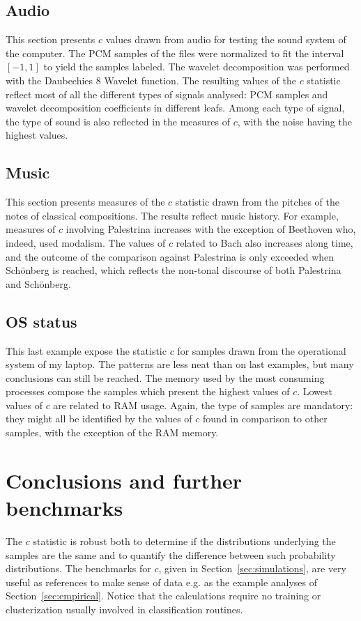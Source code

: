 \documentclass[%
	aip,
	jmp,%
	amsmath,amssymb,
	reprint,%
]{revtex4-1}
\begin{document}
\FloatBarrier
\subsection{Audio}
This section presents $c$ values
drawn from audio for testing the sound system of the computer.
The PCM samples of the files were normalized to fit the interval
$[-1,1]$ to yield the samples labeled. The wavelet decomposition was performed with the Daubechies 8 Wavelet function.
The resulting values of the $c$ statistic reflect most of all the
different types of signals analysed:
PCM samples and wavelet decomposition coefficients in different leafs.
Among each type of signal, the type of sound is also reflected in the measures of $c$, with the noise having the highest values.




\FloatBarrier
\subsection{Music}
This section presents measures of the $c$ statistic drawn
from the pitches of the notes of classical compositions.
The results reflect music history.
For example, measures of $c$ involving Palestrina
increases with the exception of Beethoven
who, indeed, used modalism.
The values of $c$ related to Bach also increases along time,
and the outcome of the comparison against Palestrina 
is only exceeded when Sch\"onberg is reached,
which reflects the non-tonal discourse of both
Palestrina and Sch\"onberg.





\FloatBarrier
\subsection{OS status}
This last example expose the statistic $c$ for samples drawn from
the operational system of my laptop.
The patterns are less neat than on last examples,
but many conclusions can still be reached.
The memory used by the most consuming processes compose
the samples which present the highest values of $c$.
Lowest values of $c$ are related to RAM usage.
Again, the type of samples are mandatory:
they might all be identified by the values of $c$
found in comparison to other samples,
with the exception of the RAM memory.



\FloatBarrier
\section{Conclusions and further benchmarks}\label{sec:conc}
The $c$ statistic is robust both to determine if
the distributions underlying the samples are the same
and to quantify the difference between such probability distributions.
The benchmarks for $c$, given in Section~\ref{sec:simulations},
are very useful as references to make sense of data 
e.g. as the example analyses of Section~\ref{sec:empirical}.
Notice that the calculations require no
training or clusterization usually involved in
classification routines.
\end{document}
